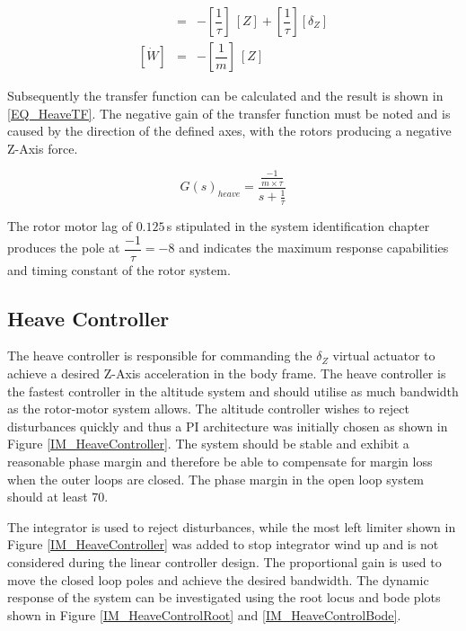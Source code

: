 	 \begin{eqnarray}
	 [\dot{Z}] &=& - [\dfrac{1}{\tau}] \ [Z] + [\dfrac{1}{\tau}] [\delta_Z]\label{EQ_HeaveStateSpace1}\\\label{EQ_HeaveStateSpace11}
	 [\dot{W}] &=& - [\dfrac{1}{m}] \ [Z]\label{EQ_HeaveStateSpace2}
	 \end{eqnarray}
	 
	 Subsequently the transfer function can be calculated and the result is shown in \eqref{EQ_HeaveTF}. The negative gain of the transfer function must be noted and is caused by the direction of the defined axes, with the rotors producing a negative Z-Axis force.
	 
	 \begin{equation}
	 G(s)_{heave} = \frac{\frac{-1}{m \times \tau}}{s + \frac{1}{\tau}}\label{EQ_HeaveTF}
	 \end{equation}
	 
	 The rotor motor lag of $0.125$\,s stipulated in the system identification chapter produces the pole at $\dfrac{-1}{\tau} = -8$ and indicates the maximum response capabilities and timing constant of the rotor system.
	 
	 \subsection{Heave Controller}
	 The heave controller is responsible for commanding the $\delta_Z$ virtual actuator to achieve a desired Z-Axis acceleration in the body frame. The heave controller is the fastest controller in the altitude system and should utilise as much bandwidth as the rotor-motor system allows. The altitude controller wishes to reject disturbances quickly and thus a PI architecture was initially chosen as shown in Figure \ref{IM_HeaveController}. The system should be stable and exhibit a reasonable phase margin and therefore be able to compensate for margin loss when the outer loops are closed. The phase margin in the open loop system should at least $70$\textdegree.
	 
	 The integrator is used to reject disturbances, while the most left limiter shown in Figure \ref{IM_HeaveController} was added to stop integrator wind up and is not considered during the linear controller design. The proportional gain is used to move the closed loop poles and achieve the desired bandwidth. The dynamic response of the system can be investigated using the root locus and bode plots shown in Figure \ref{IM_HeaveControlRoot} and \ref{IM_HeaveControlBode}. 
	 
